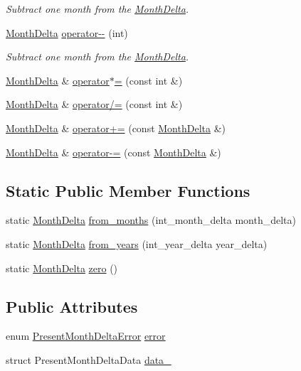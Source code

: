 \begin{DoxyCompactItemize}
\begin{DoxyCompactList}\small\item\em \-Subtract one month from the \hyperlink{structMonthDelta}{\-Month\-Delta}. \end{DoxyCompactList}\item 
\hyperlink{structMonthDelta}{\-Month\-Delta} \hyperlink{structMonthDelta_a57b2bfc986e466491dc6ae5546988de7}{operator-\/-\/} (int)
\begin{DoxyCompactList}\small\item\em \-Subtract one month from the \hyperlink{structMonthDelta}{\-Month\-Delta}. \end{DoxyCompactList}\item 
\hyperlink{structMonthDelta}{\-Month\-Delta} \& \hyperlink{structMonthDelta_ad80b56e9007353c7e71f262fad0146a6}{operator$\ast$=} (const int \&)
\item 
\hyperlink{structMonthDelta}{\-Month\-Delta} \& \hyperlink{structMonthDelta_ae1aafe21948a9865384e4d1ef1786b27}{operator/=} (const int \&)
\item 
\hyperlink{structMonthDelta}{\-Month\-Delta} \& \hyperlink{structMonthDelta_a9b3e2752469f43e31bf71390149717ef}{operator+=} (const \hyperlink{structMonthDelta}{\-Month\-Delta} \&)
\item 
\hyperlink{structMonthDelta}{\-Month\-Delta} \& \hyperlink{structMonthDelta_aead99fd037d1a43ab477733c105d1d6e}{operator-\/=} (const \hyperlink{structMonthDelta}{\-Month\-Delta} \&)
\end{DoxyCompactItemize}
\subsection*{\-Static \-Public \-Member \-Functions}
\begin{DoxyCompactItemize}
\item 
static \hyperlink{structMonthDelta}{\-Month\-Delta} \hyperlink{structMonthDelta_afc96dd6ca914abc1ddd067f8f3755a89}{from\-\_\-months} (int\-\_\-month\-\_\-delta month\-\_\-delta)
\item 
static \hyperlink{structMonthDelta}{\-Month\-Delta} \hyperlink{structMonthDelta_a02632b6ef33850d9329bd04a686ce1ed}{from\-\_\-years} (int\-\_\-year\-\_\-delta year\-\_\-delta)
\item 
static \hyperlink{structMonthDelta}{\-Month\-Delta} \hyperlink{structMonthDelta_a847cb9c956c133957dbaffb32fb9bd15}{zero} ()
\end{DoxyCompactItemize}
\subsection*{\-Public \-Attributes}
\begin{DoxyCompactItemize}
\item 
enum \hyperlink{month-delta_8h_aee28c4c9b4054448713e954a7944cb51}{\-Present\-Month\-Delta\-Error} \hyperlink{structMonthDelta_a437eb7cd23ab33a773a8fb97b5923454}{error}
\item 
struct \-Present\-Month\-Delta\-Data \hyperlink{structMonthDelta_a428f2591ca57d192424b298f95c87978}{data\-\_\-}
\end{DoxyCompactItemize}

